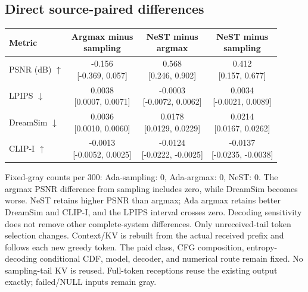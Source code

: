 \documentclass[11pt,letterpaper]{article}
\begin{document}
\subsection*{Direct source-paired differences}
\begin{center}\small\setlength{\tabcolsep}{7pt}\renewcommand{\arraystretch}{1.55}
\begin{tabular}{lccc}
\toprule
Metric & \shortstack{Argmax minus\\sampling} & \shortstack{NeST minus\\argmax} & \shortstack{NeST minus\\sampling}\\\midrule
PSNR (dB) $\uparrow$ & \shortstack{-0.156\\{}[-0.369, 0.057]} & \shortstack{0.568\\{}[0.246, 0.902]} & \shortstack{0.412\\{}[0.157, 0.677]}\\
LPIPS $\downarrow$ & \shortstack{0.0038\\{}[0.0007, 0.0071]} & \shortstack{-0.0003\\{}[-0.0072, 0.0062]} & \shortstack{0.0034\\{}[-0.0021, 0.0089]}\\
DreamSim $\downarrow$ & \shortstack{0.0036\\{}[0.0010, 0.0060]} & \shortstack{0.0178\\{}[0.0129, 0.0229]} & \shortstack{0.0214\\{}[0.0167, 0.0262]}\\
CLIP-I $\uparrow$ & \shortstack{-0.0013\\{}[-0.0052, 0.0025]} & \shortstack{-0.0124\\{}[-0.0222, -0.0025]} & \shortstack{-0.0137\\{}[-0.0235, -0.0038]}\\
\bottomrule\end{tabular}\end{center}
Fixed-gray counts per 300: Ada-sampling: 0, Ada-argmax: 0, NeST: 0.
The argmax PSNR difference from sampling includes zero, while DreamSim becomes worse. NeST retains higher PSNR than argmax; Ada argmax retains better DreamSim and CLIP-I, and the LPIPS interval crosses zero. Decoding sensitivity does not remove other complete-system differences.
Only unreceived-tail token selection changes. Context/KV is rebuilt from the actual received prefix and follows each new greedy token. The paid class, CFG composition, entropy-decoding conditional CDF, model, decoder, and numerical route remain fixed. No sampling-tail KV is reused. Full-token receptions reuse the existing output exactly; failed/NULL inputs remain gray.
\end{document}
